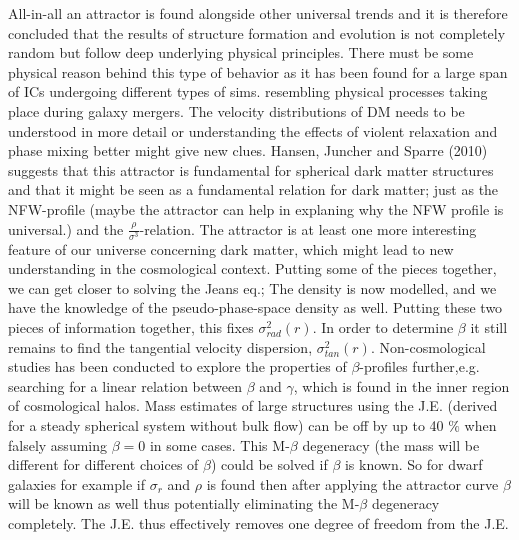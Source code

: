 All-in-all an attractor is found alongside other universal trends and it is therefore concluded that the results of structure formation and evolution is not completely random but follow deep underlying physical principles. There must be some physical reason behind this type of behavior as it has been found for a large span of ICs undergoing different types of sims. resembling physical processes taking place during galaxy mergers. The velocity distributions of DM needs to be understood in more detail or understanding the effects of violent relaxation and phase mixing better might give new clues. Hansen, Juncher and Sparre (2010) suggests that this attractor is fundamental for spherical dark matter structures and that it might be seen as a fundamental relation for dark matter; just as the NFW-profile (maybe the attractor can help in explaning why the NFW profile is universal.) and the $\frac{\rho}{\sigma^3}$-relation. The attractor is at least one more interesting feature of our universe concerning dark matter, which might lead to new understanding in the cosmological context. Putting some of the pieces together, we can get closer to solving the Jeans eq.; The density is now modelled, and we have the knowledge of the pseudo-phase-space density as well. Putting these two pieces of information together, this fixes $\sigma_{rad}^2(r)$. In order to determine $\beta$ it still remains to find the tangential velocity dispersion, $\sigma_{tan}^2(r)$. Non-cosmological studies has been conducted to explore the properties of $\beta$-profiles further,e.g. searching for a linear relation between $\beta$ and $\gamma$, which is found in the inner region of cosmological halos. Mass estimates of large structures using the J.E. (derived for a steady spherical system without bulk flow) can be off by up to 40 $\%$ when falsely assuming $\beta = 0$ in some cases. This M-$\beta$ degeneracy (the mass will be different for different choices of $\beta$) could be solved if $\beta$ is known. So for dwarf galaxies for example if $\sigma_r$ and $\rho$ is found then after applying the attractor curve $\beta$ will be known as well thus potentially eliminating the M-$\beta$ degeneracy completely. The J.E. thus effectively removes one degree of freedom from the J.E. \\ 

